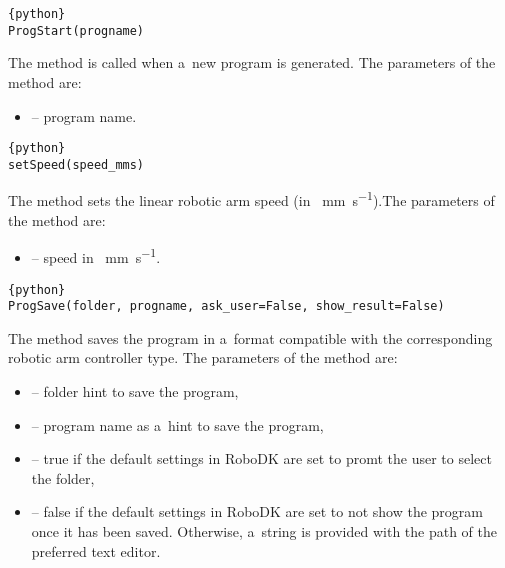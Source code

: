 \begin{lstlisting}[frame=lines,numbers=none,breaklines=true]{python}
ProgStart(progname)
\end{lstlisting}
The  method is called when a~new program is generated. The parameters of the  method are:

\begin{itemize}

\item {} -- program name.

\end{itemize}

\begin{lstlisting}[frame=lines,numbers=none,breaklines=true]{python}
setSpeed(speed_mms)
\end{lstlisting}
The  method sets the linear robotic arm speed (in \SI{}{\mm\per\second}).The parameters of the   method are:

\begin{itemize}

\item {} -- speed in \SI{}{\mm\per\second}.

\end{itemize}

\begin{lstlisting}[frame=lines,numbers=none,breaklines=true]{python}
ProgSave(folder, progname, ask_user=False, show_result=False)
\end{lstlisting}
The  method saves the program in a~format compatible with the corresponding robotic arm controller type. The parameters of the  method are:

\begin{itemize}

\item {} -- folder hint to save the program,

\item {} -- program name as a~hint to save the program,

\item {} -- true if the default settings in RoboDK are set to promt the user to select the folder, 

\item {} -- false if the default settings in RoboDK are set to not show the program once it has been saved. Otherwise, a~string is provided with the path of the preferred text editor.

\end{itemize}

